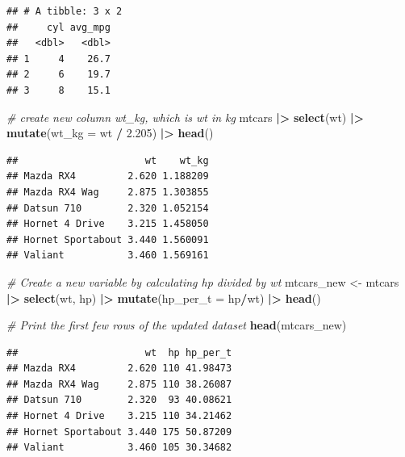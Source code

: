 \documentclass[
  12pt,
  oneside]{book}
\newenvironment{Shaded}{\begin{snugshade}}{\end{snugshade}}
\newcommand{\AttributeTok}[1]{\textcolor[rgb]{0.13,0.29,0.53}{#1}}
\newcommand{\CommentTok}[1]{\textcolor[rgb]{0.56,0.35,0.01}{\textit{#1}}}
\newcommand{\FloatTok}[1]{\textcolor[rgb]{0.00,0.00,0.81}{#1}}
\newcommand{\FunctionTok}[1]{\textcolor[rgb]{0.13,0.29,0.53}{\textbf{#1}}}
\newcommand{\NormalTok}[1]{#1}
\newcommand{\OtherTok}[1]{\textcolor[rgb]{0.56,0.35,0.01}{#1}}
\newcommand{\SpecialCharTok}[1]{\textcolor[rgb]{0.81,0.36,0.00}{\textbf{#1}}}
\begin{document}
\begin{verbatim}
## # A tibble: 3 x 2
##     cyl avg_mpg
##   <dbl>   <dbl>
## 1     4    26.7
## 2     6    19.7
## 3     8    15.1
\end{verbatim}

\begin{Shaded}
\begin{Highlighting}[]
\CommentTok{\# create new column wt\_kg, which is wt in kg}
\NormalTok{mtcars }\SpecialCharTok{|\textgreater{}} 
  \FunctionTok{select}\NormalTok{(wt) }\SpecialCharTok{|\textgreater{}} 
  \FunctionTok{mutate}\NormalTok{(}\AttributeTok{wt\_kg =}\NormalTok{ wt }\SpecialCharTok{/} \FloatTok{2.205}\NormalTok{) }\SpecialCharTok{|\textgreater{}} 
  \FunctionTok{head}\NormalTok{()}
\end{Highlighting}
\end{Shaded}

\begin{verbatim}
##                      wt    wt_kg
## Mazda RX4         2.620 1.188209
## Mazda RX4 Wag     2.875 1.303855
## Datsun 710        2.320 1.052154
## Hornet 4 Drive    3.215 1.458050
## Hornet Sportabout 3.440 1.560091
## Valiant           3.460 1.569161
\end{verbatim}

\begin{Shaded}
\begin{Highlighting}[]
\CommentTok{\# Create a new variable by calculating hp divided by wt}
\NormalTok{mtcars\_new }\OtherTok{\textless{}{-}}\NormalTok{ mtcars }\SpecialCharTok{|\textgreater{}} 
  \FunctionTok{select}\NormalTok{(wt, hp) }\SpecialCharTok{|\textgreater{}} 
  \FunctionTok{mutate}\NormalTok{(}\AttributeTok{hp\_per\_t =}\NormalTok{ hp}\SpecialCharTok{/}\NormalTok{wt) }\SpecialCharTok{|\textgreater{}} 
  \FunctionTok{head}\NormalTok{()}

\CommentTok{\# Print the first few rows of the updated dataset}
\FunctionTok{head}\NormalTok{(mtcars\_new)}
\end{Highlighting}
\end{Shaded}

\begin{verbatim}
##                      wt  hp hp_per_t
## Mazda RX4         2.620 110 41.98473
## Mazda RX4 Wag     2.875 110 38.26087
## Datsun 710        2.320  93 40.08621
## Hornet 4 Drive    3.215 110 34.21462
## Hornet Sportabout 3.440 175 50.87209
## Valiant           3.460 105 30.34682
\end{verbatim}
\end{document}
